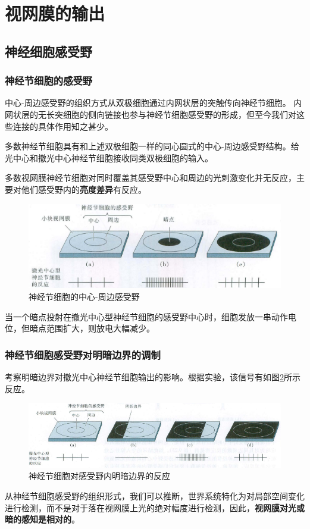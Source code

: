 \section{视网膜的输出}

\subsection{神经细胞感受野}
\begin{frame}
    \frametitle{神经节细胞的感受野}
            中心-周边感受野的组织方式从双极细胞通过内网状层的突触传向神经节细胞。
            内网状层的无长突细胞的侧向链接也参与神经节细胞感受野的形成，但至今我们对这些连接的具体作用知之甚少。
        
            多数神经节细胞具有和上述双极细胞一样的同心圆式的中心-周边感受野结构。给光中心和撤光中心神经节细胞接收同类双极细胞的输入。
        
            多数视网膜神经节细胞对同时覆盖其感受野中心和周边的光刺激变化并无反应，主要对他们感受野内的\textbf{亮度差异}有反应。        
            \begin{figure}
                \centering
                \includegraphics[width=.75\textwidth]{img/pic7-1.png}
                \caption{神经节细胞的中心-周边感受野\label{pic7-1}}
            \end{figure}
            \tiny{
                当一个暗点投射在撤光中心型神经节细胞的感受野中心时，细胞发放一串动作电位，但暗点范围扩大，则放电大幅减少。
            }
    
\end{frame}

\begin{frame}
    \frametitle{神经节细胞感受野对明暗边界的调制}
    考察明暗边界对撤光中心神经节细胞输出的影响。根据实验，该信号有如图\ref{pic7-2}所示反应。%
    \begin{figure}
        \centering
        \includegraphics[width=.8\textwidth]{img/pic7-2.png}
        \caption{神经节细胞对感受野内明暗边界的反应\label{pic7-2}}
    \end{figure}
    从神经节细胞感受野的组织形式，我们可以推断，世界系统特化为对局部空间变化进行检测，而不是对于落在视网膜上光的绝对幅度进行检测，因此，\textbf{视网膜对光或暗的感知是相对的}。
\end{frame}

